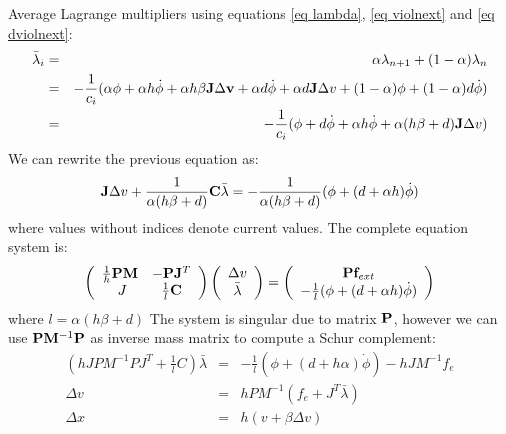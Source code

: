 Average Lagrange multipliers using equations \ref{eq lambda}, \ref{eq violnext} and \ref{eq dviolnext}:
\begin{eqnarray*}
 \avlam_i &=& \alpha \lnext + (1-\alpha) \lcur \\
&=& -\frac{1}{c_i} ( \alpha \violation + \alpha h \dviolation  + \alpha h \beta \J \Delta \vel + \alpha d \dviolation + \alpha d \J \Delta v + (1-\alpha)\violation + (1-\alpha) d \dviolation  ) \\
&=& -\frac{1}{c_i} ( \violation + d\dviolation + \alpha h \dviolation + \alpha(h\beta+d)\J \Delta v )
\end{eqnarray*}
We can rewrite the previous equation as:
\begin{equation}
 \J \Delta v + \frac{1}{\alpha(h\beta+d)}\C\avlam = - \frac{1}{\alpha(h\beta+d)} (\violation + (d+\alpha h)\dviolation)
\end{equation}
where values without indices denote current values.
The complete equation system is:
\begin{equation}
 \left( \begin{array}{cc}
\frac{1}{h}\P\M & -\P\Jt \\
\ J & \frac{1}{l} \C \end{array}\right)
\left( \begin{array}{c}
\Delta v \\ \avlam
\end{array}\right) = \left( \begin{array}{c}
\P\forcext  \\
- \frac{1}{l} (\violation +(d+\alpha h) \dviolation)
\end{array}\right) 
\end{equation}
where $ l=\alpha(h \beta + d) $
The system is singular due to matrix $\P $, however we can use $ \P \Minv\P $ as inverse mass matrix to compute a Schur complement:
\[ \begin{array}{ccc}
\left( hJPM^{-1}PJ^T + \frac{1}{l}C \right) \bar\lambda &=& -\frac{1}{l} \left(\phi + (d+h\alpha)\dot\phi \right) - hJ M^{-1} f_e \\
\Delta v &=& hP M^{-1}( f_e + J^T \bar\lambda ) \\
\Delta x &=& h( v + \beta \Delta v )
\end{array} \]
